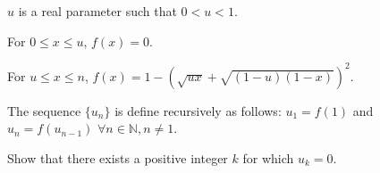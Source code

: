 $u$ is a real parameter such that $0<u<1$.

For $0\le x \le u$,  $f(x)=0$.

For $u\le x \le n$,  $f(x)=1-\left(\sqrt{ux}+\sqrt{(1-u)(1-x)}\right)^2$.

The sequence $\{u_n\}$ is define recursively as follows: $u_1=f(1)$ and $u_n=f(u_{n-1})$ $\forall n\in \mathbb{N}, n\neq 1$.

Show that there exists a positive integer $k$ for which $u_k=0$.